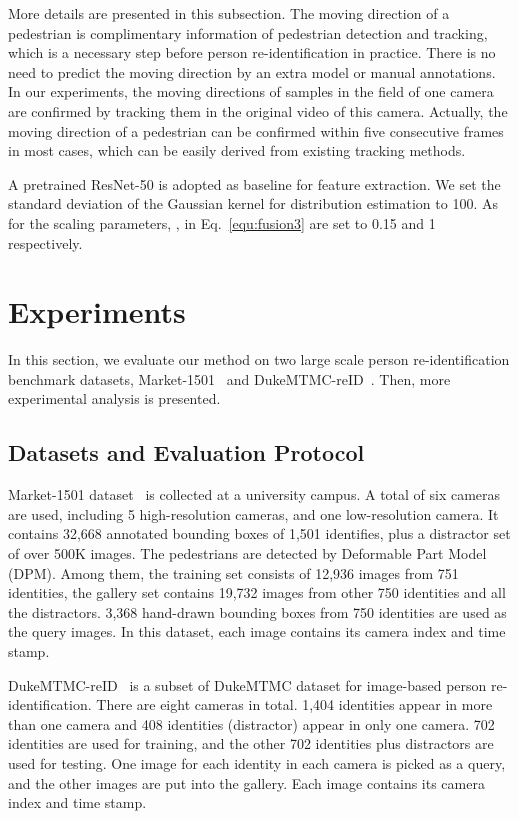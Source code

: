 \documentclass[10pt,twocolumn,letterpaper]{article}
\begin{document}
More details are presented in this subsection.
The moving direction of a pedestrian is complimentary information of pedestrian detection and tracking, which is a necessary step before person re-identification in practice.
There is no need to predict the moving direction by an extra model or manual annotations.
In our experiments, the moving directions of samples in the field of one camera are confirmed by tracking them in the original video of this camera.
Actually, the moving direction of a pedestrian can be confirmed within five consecutive frames in most cases, which can be easily derived from existing tracking methods.

A pretrained ResNet-50 is adopted as baseline for feature extraction.
We set the standard deviation of the Gaussian kernel for distribution estimation to 100.
As for the scaling parameters, ,  in Eq.~\ref{equ:fusion3} are set to 0.15 and 1 respectively.





\section{Experiments}

In this section, we evaluate our method on two large scale person re-identification benchmark datasets, \ie Market-1501~\cite{Zheng2015Scalable} and DukeMTMC-reID~\cite{Ergys2016Performance}. Then, more experimental analysis is presented.



\subsection{Datasets and Evaluation Protocol}

Market-1501 dataset~\cite{Zheng2015Scalable} is collected at a university campus. A total of six cameras are used, including 5 high-resolution cameras, and one low-resolution camera. It contains 32,668 annotated bounding boxes of 1,501 identifies, plus a distractor set of over 500K images. The pedestrians are detected by  Deformable Part Model (DPM). Among them, the training set consists of 12,936 images from 751 identities, the gallery set contains 19,732 images from other 750 identities and all the distractors. 3,368 hand-drawn bounding boxes from 750 identities are used as the query images. In this dataset, each image contains its camera index and time stamp.

DukeMTMC-reID~\cite{Ergys2016Performance} is a subset of DukeMTMC dataset for image-based person re-identification. There are eight cameras in total. 1,404 identities appear in more than one camera and 408 identities (distractor) appear in only one camera. 702 identities are used for training, and the other 702 identities plus distractors are used for testing. One image for each identity in each camera is picked as a query, and the other images are put into the gallery. Each image contains its camera index and time stamp.
\end{document}
